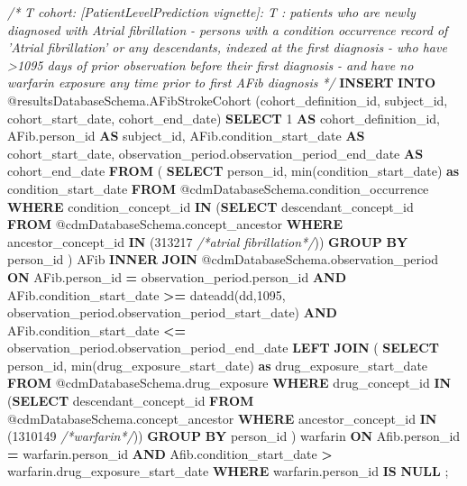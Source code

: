 \documentclass[
]{article}
\newenvironment{Shaded}{\begin{snugshade}}{\end{snugshade}}
\newcommand{\CommentTok}[1]{\textcolor[rgb]{0.56,0.35,0.01}{\textit{#1}}}
\newcommand{\DecValTok}[1]{\textcolor[rgb]{0.00,0.00,0.81}{#1}}
\newcommand{\FunctionTok}[1]{\textcolor[rgb]{0.00,0.00,0.00}{#1}}
\newcommand{\KeywordTok}[1]{\textcolor[rgb]{0.13,0.29,0.53}{\textbf{#1}}}
\newcommand{\NormalTok}[1]{#1}
\newcommand{\OperatorTok}[1]{\textcolor[rgb]{0.81,0.36,0.00}{\textbf{#1}}}
\begin{document}
\begin{Shaded}
\begin{Highlighting}[]
\CommentTok{/*}
\CommentTok{T cohort:  [PatientLevelPrediction vignette]:  T : patients who are newly }
\CommentTok{diagnosed with Atrial fibrillation}
\CommentTok{- persons with a condition occurrence record of 'Atrial fibrillation' or }
\CommentTok{any descendants, indexed at the first diagnosis}
\CommentTok{- who have >1095 days of prior observation before their first diagnosis}
\CommentTok{- and have no warfarin exposure any time prior to first AFib diagnosis}
\CommentTok{*/}
\KeywordTok{INSERT} \KeywordTok{INTO}\NormalTok{ @resultsDatabaseSchema.AFibStrokeCohort (cohort_definition_id, }
\NormalTok{subject_id, }
\NormalTok{cohort_start_date, }
\NormalTok{cohort_end_date)}
\KeywordTok{SELECT} \DecValTok{1} \KeywordTok{AS}\NormalTok{ cohort_definition_id,}
\NormalTok{AFib.person_id }\KeywordTok{AS}\NormalTok{ subject_id,}
\NormalTok{AFib.condition_start_date }\KeywordTok{AS}\NormalTok{ cohort_start_date,}
\NormalTok{observation_period.observation_period_end_date }\KeywordTok{AS}\NormalTok{ cohort_end_date}
\KeywordTok{FROM}
\NormalTok{(}
  \KeywordTok{SELECT}\NormalTok{ person_id, }\FunctionTok{min}\NormalTok{(condition_start_date) }\KeywordTok{as}\NormalTok{ condition_start_date}
  \KeywordTok{FROM}\NormalTok{ @cdmDatabaseSchema.condition_occurrence}
  \KeywordTok{WHERE}\NormalTok{ condition_concept_id }\KeywordTok{IN}\NormalTok{ (}\KeywordTok{SELECT}\NormalTok{ descendant_concept_id }\KeywordTok{FROM} 
\NormalTok{  @cdmDatabaseSchema.concept_ancestor }\KeywordTok{WHERE}\NormalTok{ ancestor_concept_id }\KeywordTok{IN} 
\NormalTok{  (}\DecValTok{313217} \CommentTok{/*atrial fibrillation*/}\NormalTok{))}
  \KeywordTok{GROUP} \KeywordTok{BY}\NormalTok{ person_id}
\NormalTok{) AFib}
  \KeywordTok{INNER} \KeywordTok{JOIN}\NormalTok{ @cdmDatabaseSchema.observation_period}
  \KeywordTok{ON}\NormalTok{ AFib.person_id }\OperatorTok{=}\NormalTok{ observation_period.person_id}
  \KeywordTok{AND}\NormalTok{ AFib.condition_start_date }\OperatorTok{>=}\NormalTok{ dateadd(dd,}\DecValTok{1095}\NormalTok{, }
\NormalTok{  observation_period.observation_period_start_date)}
  \KeywordTok{AND}\NormalTok{ AFib.condition_start_date }\OperatorTok{<=}\NormalTok{ observation_period.observation_period_end_date}
  \KeywordTok{LEFT} \KeywordTok{JOIN}
\NormalTok{  (}
  \KeywordTok{SELECT}\NormalTok{ person_id, }\FunctionTok{min}\NormalTok{(drug_exposure_start_date) }\KeywordTok{as}\NormalTok{ drug_exposure_start_date}
  \KeywordTok{FROM}\NormalTok{ @cdmDatabaseSchema.drug_exposure}
  \KeywordTok{WHERE}\NormalTok{ drug_concept_id }\KeywordTok{IN}\NormalTok{ (}\KeywordTok{SELECT}\NormalTok{ descendant_concept_id }\KeywordTok{FROM} 
\NormalTok{  @cdmDatabaseSchema.concept_ancestor }\KeywordTok{WHERE}\NormalTok{ ancestor_concept_id }\KeywordTok{IN} 
\NormalTok{  (}\DecValTok{1310149} \CommentTok{/*warfarin*/}\NormalTok{))}
  \KeywordTok{GROUP} \KeywordTok{BY}\NormalTok{ person_id}
\NormalTok{  ) warfarin}
  \KeywordTok{ON}\NormalTok{ Afib.person_id }\OperatorTok{=}\NormalTok{ warfarin.person_id}
  \KeywordTok{AND}\NormalTok{ Afib.condition_start_date }\OperatorTok{>}\NormalTok{ warfarin.drug_exposure_start_date}
  \KeywordTok{WHERE}\NormalTok{ warfarin.person_id }\KeywordTok{IS} \KeywordTok{NULL}
\NormalTok{  ;}
  

\end{Highlighting}
\end{Shaded}
\end{document}

